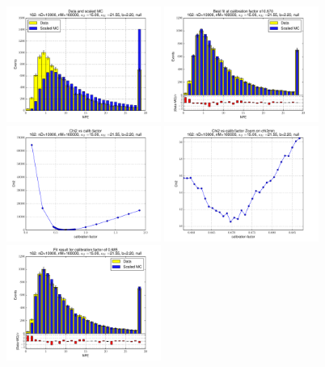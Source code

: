 
 \begin{figure}[htbp] \begin{center} 
\includegraphics[width=0.45\textwidth]{../FIGURES/162/FIG_Data_and_scaled_MC.pdf} 
\includegraphics[width=0.45\textwidth]{../FIGURES/162/FIG_Best_fit_at_calibration_factor_of_0_670.pdf} 
\includegraphics[width=0.45\textwidth]{../FIGURES/162/FIG_Chi2_vs_calib_factor.pdf} 
\includegraphics[width=0.45\textwidth]{../FIGURES/162/FIG_Chi2_vs_calib_factor_Zoom_on_chi2min.pdf} 
\includegraphics[width=0.45\textwidth]{../FIGURES/162/FIG_Fit_result_for_calibration_factor_of_0_685.pdf} 

\end{center}
\end{figure}
